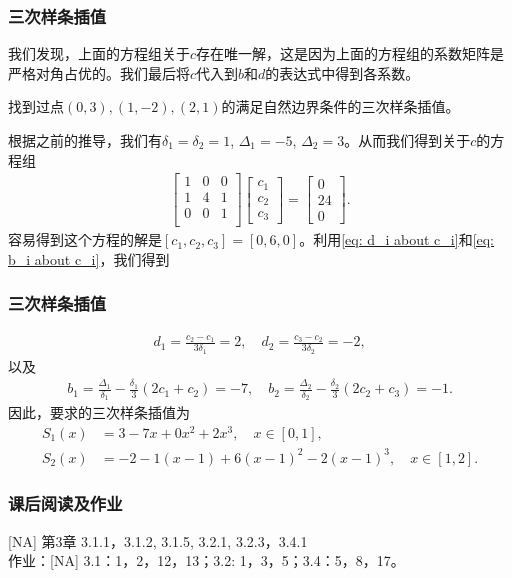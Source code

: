 \documentclass[10pt]{beamer}
\begin{document}
\begin{frame}
\frametitle{三次样条插值}
我们发现，上面的方程组关于$c$存在唯一解，这是因为上面的方程组的系数矩阵是严格对角占优的。我们最后将$c$代入到$b$和$d$的表达式中得到各系数。

\begin{example}
找到过点$(0,3), (1,-2), (2,1)$的满足自然边界条件的三次样条插值。
\end{example}
根据之前的推导，我们有$\delta_1 = \delta_2 = 1$, $\Delta_1 = -5$, $\Delta_2 = 3$。从而我们得到关于$c$的方程组
\begin{align}
\left[ \begin{array}{ccc}
     1                 & 0                             & 0                                      \\  
     1      & 4 &1                            \\ 
     0                 &0                  & 1       \\    
       \end{array} \right] 
\left[ \begin{array}{c} 
      c_{1} \\ c_2\\ c_3 \end{array} \right] 
=
\left[ \begin{array}{c}
     0 \\ 24 \\ 0 \end{array} \right].
\end{align}
容易得到这个方程的解是$[c_1, c_2, c_3] = [0, 6, 0]$。利用\eqref{eq: d_i about c_i}和\eqref{eq: b_i about c_i}，我们得到
\end{frame}


\begin{frame}
\frametitle{三次样条插值}
\begin{align}
d_1 = \frac{c_2 - c_1}{3 \delta_1} = 2, \quad d_2 = \frac{c_3 - c_2}{3 \delta_2} = -2,
\end{align}
以及
\begin{align}
b_1 = \frac{\Delta_1}{\delta_1}  - \frac{\delta_1}{3}(2c_1 + c_2) = -7, \quad b_2 = \frac{\Delta_2}{\delta_2}  - \frac{\delta_2}{3}(2c_2 + c_3) = -1.
\end{align}
因此，要求的三次样条插值为
\begin{align}
S_1(x) &= 3 - 7x + 0x^2 + 2x^3, \quad x \in [0,1], \nonumber \\
S_2(x) &= -2 -1(x-1) + 6(x-1)^2 - 2(x-1)^3, \quad x \in [1,2].
\end{align}
\end{frame}

\begin{frame}
\frametitle{课后阅读及作业}
[NA] 第3章 3.1.1，3.1.2, 3.1.5, 3.2.1, 3.2.3，3.4.1 \\
作业：[NA] 3.1：1，2，12，13；3.2: 1，3，5；3.4：5，8，17。


\end{frame}
\end{document}
